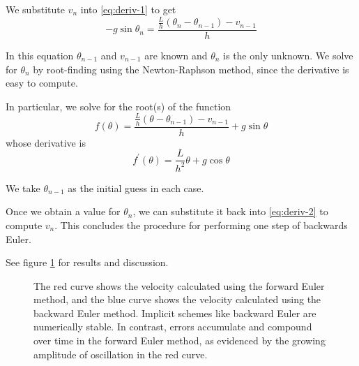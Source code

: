 \documentclass[11pt,letterpaper]{article}
\begin{document}
We substitute $v_n$ into \eqref{eq:deriv-1} to get
%
\begin{equation*}
  -g \sin \theta_n = \frac{\frac{L}{h}(\theta_n - \theta_{n-1}) - v_{n-1}}{h}
\end{equation*}

In this equation $\theta_{n-1}$ and $v_{n-1}$ are known and $\theta_n$ is the
only unknown. We solve for $\theta_n$ by root-finding using the Newton-Raphson
method, since the derivative is easy to compute.

In particular, we solve for the root(s) of the function
%
\begin{equation*}
  f(\theta)
  = \frac{\frac{L}{h}(\theta - \theta_{n-1}) - v_{n-1}}{h}
  + g \sin \theta
\end{equation*}
%
whose derivative is
%
\begin{equation*}
  f^\prime(\theta)
  = \frac{L}{h^2} \theta + g \cos \theta
\end{equation*}

We take $\theta_{n-1}$ as the initial guess in each case.

Once we obtain a value for $\theta_n$, we can substitute it back into
\eqref{eq:deriv-2} to compute $v_n$. This concludes the procedure for
performing one step of backwards Euler.

See figure \ref{fig:q2} for results and discussion.

\begin{figure}[h]
  \centering
  \caption{%
    The red curve shows the velocity calculated using the forward Euler method,
    and the blue curve shows the velocity calculated using the backward Euler
    method.
    Implicit schemes like backward Euler are numerically stable.
    In contrast, errors accumulate and compound over time in the forward Euler
    method, as evidenced by the growing amplitude of oscillation in the red
    curve.
  }
  \label{fig:q2}
\end{figure}
\end{document}
